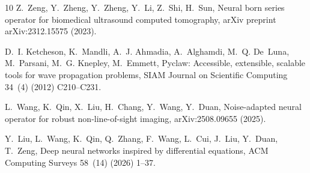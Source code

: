 \documentclass[preprint,numbers,sort&compress]{elsarticle}
\begin{document}
\begin{thebibliography}{10}
				Z.~Zeng, Y.~Zheng, Y.~Zheng, Y.~Li, Z.~Shi, H.~Sun, Neural born series operator
				for biomedical ultrasound computed tomography, arXiv preprint
				arXiv:2312.15575 (2023).
				
				D.~I. Ketcheson, K.~Mandli, A.~J. Ahmadia, A.~Alghamdi, M.~Q. De~Luna,
				M.~Parsani, M.~G. Knepley, M.~Emmett, Pyclaw: Accessible, extensible,
				scalable tools for wave propagation problems, SIAM Journal on Scientific
				Computing 34~(4) (2012) C210--C231.
				
				L.~Wang, K.~Qin, X.~Liu, H.~Chang, Y.~Wang, Y.~Duan,
				Noise-adapted neural operator for robust non-line-of-sight imaging,
				arXiv:2508.09655 (2025).
				
				Y.~Liu, L.~Wang, K.~Qin, Q.~Zhang, F.~Wang, L.~Cui, J.~Liu, Y.~Duan,
				T.~Zeng, Deep neural networks inspired by differential equations,
				ACM Computing Surveys 58~(14) (2026) 1--37.
				
			\end{thebibliography}
			
				
				
				
				
		
\end{document}
